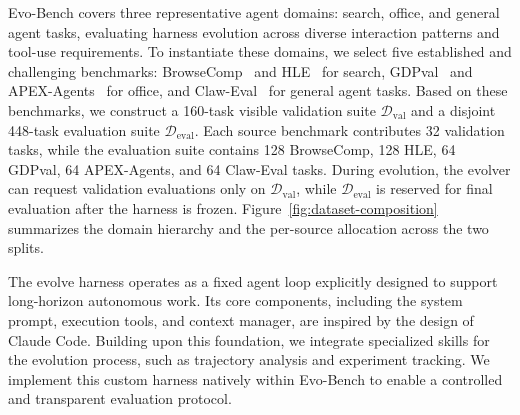 \label{sec:benchmark-composition}
Evo-Bench covers three representative agent domains: search, office, and general agent tasks, evaluating harness evolution across diverse interaction patterns and tool-use requirements.
To instantiate these domains, we select five  established and challenging benchmarks: BrowseComp~\citep{browsecomp} and HLE~\citep{hle} for search, GDPval~\citep{gdpval} and APEX-Agents~\citep{apexagents} for office, and Claw-Eval~\citep{claweval} for general agent tasks. 
Based on these benchmarks, we construct a 160-task visible validation suite $\mathcal{D}_{\mathrm{val}}$ and a disjoint 448-task evaluation suite $\mathcal{D}_{\mathrm{eval}}$. 
Each source benchmark contributes 32 validation tasks, while the evaluation suite contains 128 BrowseComp, 128 HLE, 64 GDPval, 64 APEX-Agents, and 64 Claw-Eval tasks.
During evolution, the evolver can request validation evaluations only on $\mathcal{D}_{\mathrm{val}}$, while $\mathcal{D}_{\mathrm{eval}}$ is reserved for final evaluation after the harness is frozen.
Figure~\ref{fig:dataset-composition} summarizes the domain hierarchy and the
per-source allocation across the two splits.


\label{sec:evolve-harness}
The evolve harness operates as a fixed agent loop explicitly designed to support long-horizon autonomous work. Its core components, including the system prompt, execution tools, and context manager, are inspired by the design of Claude Code. Building upon this foundation, we integrate specialized skills for the evolution process, such as trajectory analysis and experiment tracking. We implement this custom harness natively within Evo-Bench to enable a controlled and transparent evaluation protocol.

